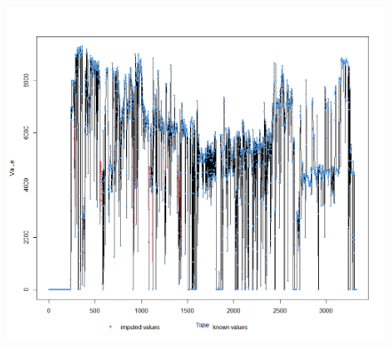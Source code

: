 \documentclass[xcolor=table]{beamer}
\begin{document}
\begin{frame}
\begin{columns}[c]
\begin{figure}
\includegraphics[width=1\linewidth,left]{WI_imputation1.png} 
\end{figure}


\end{columns}

\end{frame}
\end{document}
